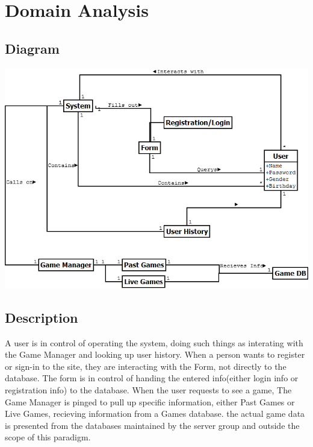 %

\section{Domain Analysis}

	\subsection{Diagram}
		\includegraphics[width=1.0\textwidth]{./Diagram1.png}

	\subsection{Description}
		A user is in control of operating the system, doing such things as interating with the Game Manager and looking up user history. When a person wants to register or sign-in to the site, they are interacting with the Form, not directly to the database. The form is in control of handing the entered info(either login info or registration info) to the database. When the user requests to see a game, The Game Manager is pinged to pull up specific information, either Past Games or Live Games, recieving information from a Games database. the actual game data is presented from the databases maintained by the server group and outside the scope of this paradigm. 

\newpage